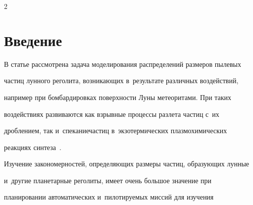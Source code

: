 

 


\vspace*{9pt}













\thispagestyle{headings}





\begin{multicols}{2}





\label{st\stat}








\section{Введение}





\vspace*{-3pt}





В статье рассмотрена задача моделирования распределений размеров пылевых 


частиц лунного ре\-го\-лита, возникающих в~результате различных воздействий, 


например при бомбардировках \mbox{поверхности} Луны метеоритами. При таких 


воз\-действиях развиваются как взрывные процессы разлета час\-тиц с~их 


дроблением, так и~спекание\linebreak час\-тиц в~экзотермических плазмохимических 


реакциях синтеза~\cite{Popel2018}.





Изучение закономерностей, определяющих размеры частиц, образующих лунные 


и~другие планетарные реголиты, имеет очень большое значение при 


планировании автоматических и~пи\-ло\-ти\-ру\-емых миссий для изучения 



\end{multicols}
